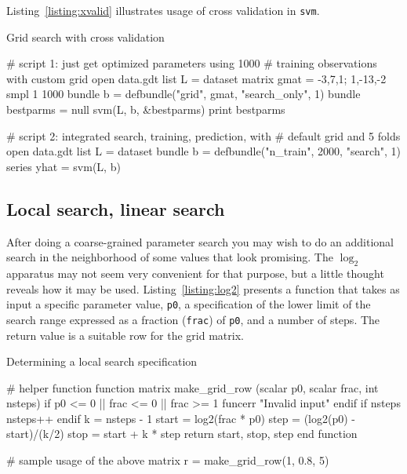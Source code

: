 \documentclass{article}
\begin{document}
Listing~\ref{listing:xvalid} illustrates usage of cross validation in
\texttt{svm}.

\begin{script}[htbp]
  \caption{Grid search with cross validation}
  \label{listing:xvalid}
\begin{scode}
# script 1: just get optimized parameters using 1000
# training observations with custom grid
open data.gdt
list L = dataset
matrix gmat = {-3,7,1; 1,-13,-2}
smpl 1 1000
bundle b = defbundle("grid", gmat, "search_only", 1)
bundle bestparms = null
svm(L, b, &bestparms)
print bestparms

# script 2: integrated search, training, prediction, with
# default grid and 5 folds
open data.gdt
list L = dataset
bundle b = defbundle("n_train", 2000, "search", 1)
series yhat = svm(L, b)
\end{scode}
\end{script}

\subsection{Local search, linear search}
\label{sec:local-search}

After doing a coarse-grained parameter search you may wish to do an
additional search in the neighborhood of some values that look
promising.  The $\log_2$ apparatus may not seem very convenient for
that purpose, but a little thought reveals how it may be
used. Listing~\ref{listing:log2} presents a function that takes as
input a specific parameter value, \texttt{p0}, a specification of the
lower limit of the search range expressed as a fraction
(\texttt{frac}) of \texttt{p0}, and a number of steps. The return
value is a suitable row for the grid matrix.

\begin{script}[htbp]
  \caption{Determining a local search specification}
  \label{listing:log2}
\begin{scode}
# helper function
function matrix make_grid_row (scalar p0, scalar frac, int nsteps)
  if p0 <= 0 || frac <= 0 || frac >= 1
    funcerr "Invalid input"
  endif
  if nsteps %
    nsteps++
  endif
  k = nsteps - 1
  start = log2(frac * p0)
  step = (log2(p0) - start)/(k/2)
  stop = start + k * step
  return {start, stop, step}
end function

# sample usage of the above
matrix r = make_grid_row(1, 0.8, 5)
\end{scode}
\end{script}
\end{document}
